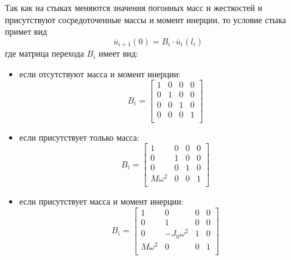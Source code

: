 Так как на стыках меняются значения погонных масс и жесткостей и присутствуют сосредоточенные массы и момент инерции, то условие стыка примет вид
\begin{equation}
    \label{eq7}
    \overline{u}_{i+1}(0) = B_i \cdot \overline{u}_i(l_i)
\end{equation}
где матрица перехода $B_i$ имеет вид:
\begin{itemize}
    \item если отсутствуют масса и момент инерции:
    \begin{equation}
        \label{eq7.1}
        B_i =
        \begin{bmatrix}
            1 & 0 & 0 & 0
            \\
            0 & 1 & 0 & 0
            \\
            0 & 0 & 1 & 0
            \\
            0 & 0 & 0 & 1
            \\
        \end{bmatrix}
    \end{equation}
    \item если присутствует только масса:
    \begin{equation}
        \label{eq7.2}
        B_i =
        \begin{bmatrix}
            1 & 0 & 0 & 0
            \\
            0 & 1 & 0 & 0
            \\
            0 & 0 & 1 & 0
            \\
            M \omega^2 & 0 & 0 & 1
            \\
        \end{bmatrix}
    \end{equation}
    \item если присутствует масса и момент инерции:
    \begin{equation}
        \label{eq7.3}
        B_i =
        \begin{bmatrix}
            1 & 0 & 0 & 0
            \\
            0 & 1 & 0 & 0
            \\
            0 & -J_0 \omega^2 & 1 & 0
            \\
            M \omega^2 & 0 & 0 & 1
            \\
        \end{bmatrix}
    \end{equation}
\end{itemize}

